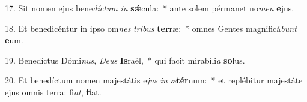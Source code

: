 17. Sit nomen ejus bene\textit{díc}\textit{tum} \textit{in} \textbf{sǽ}cula:~*  ante solem pérmanet no\textit{men} \textbf{e}jus.\

18. Et benedicéntur in ipso om\textit{nes} \textit{tri}\textit{bus} \textbf{ter}ræ:~*  omnes Gentes magnificá\textit{bunt} \textbf{e}um.\

19. Benedíctus Dómi\textit{nus}, \textit{De}\textit{us} \textbf{Is}raël,~*  qui facit mirabíli\textit{a} \textbf{so}lus.\

20. Et benedíctum nomen majestátis e\textit{jus} \textit{in} \textit{æ}\textbf{tér}num:~*  et replébitur majestáte ejus omnis terra: fi\textit{at}, \textbf{fi}at.\

